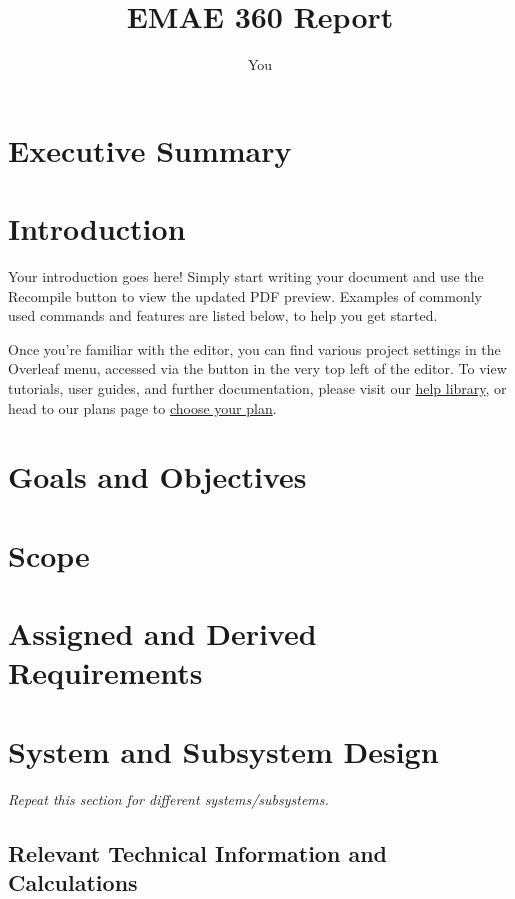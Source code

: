 \documentclass{article}
\title{EMAE 360 Report}
\author{You}
\begin{document}
\maketitle
\newpage

\tableofcontents
\newpage

\section*{Executive Summary}
\newpage

\section{Introduction}

Your introduction goes here! Simply start writing your document and use the Recompile button to view the updated PDF preview. Examples of commonly used commands and features are listed below, to help you get started.

Once you're familiar with the editor, you can find various project settings in the Overleaf menu, accessed via the button in the very top left of the editor. To view tutorials, user guides, and further documentation, please visit our \href{https://www.overleaf.com/learn}{help library}, or head to our plans page to \href{https://www.overleaf.com/user/subscription/plans}{choose your plan}.

\section{Goals and Objectives}

\newpage
\section{Scope}

\newpage
\section{Assigned and Derived Requirements}

\newpage
\section{System and Subsystem Design}
\textit{Repeat this section for different systems/subsystems.}

\subsection{Relevant Technical Information and Calculations}
\end{document}
